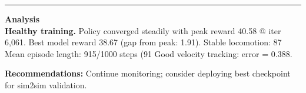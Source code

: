 \documentclass[a4paper,10pt]{article}
\begin{document}
\vspace{2pt}
\hrule
\vspace{2pt}

\footnotesize
\textbf{Analysis} \\[1pt]
\textbf{Healthy training.} Policy converged steadily with peak reward 40.58 @ iter 6,061.
Best model reward 38.67 (gap from peak: 1.91).
Stable locomotion: 87%
Mean episode length: 915/1000 steps (91%
Good velocity tracking: error = 0.388.

\textbf{Recommendations:}
Continue monitoring; consider deploying best checkpoint for sim2sim validation.
\end{document}
